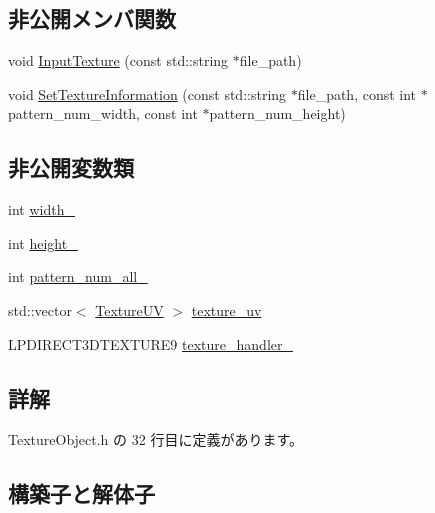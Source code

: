 \subsection*{非公開メンバ関数}
\begin{DoxyCompactItemize}
\item 
void \mbox{\hyperlink{class_texture_object_a93196fc80c026672b8a15cec21ef5dea}{Input\+Texture}} (const std\+::string $\ast$file\+\_\+path)
\item 
void \mbox{\hyperlink{class_texture_object_a76d33ff56004c8f8f00b004849990940}{Set\+Texture\+Information}} (const std\+::string $\ast$file\+\_\+path, const int $\ast$pattern\+\_\+num\+\_\+width, const int $\ast$pattern\+\_\+num\+\_\+height)
\end{DoxyCompactItemize}
\subsection*{非公開変数類}
\begin{DoxyCompactItemize}
\item 
int \mbox{\hyperlink{class_texture_object_a8e3d1b2b233672e0ea161b21d9c1cae0}{width\+\_\+}}
\item 
int \mbox{\hyperlink{class_texture_object_a093e31e35a181fe208cc8a0c0cdb5e2f}{height\+\_\+}}
\item 
int \mbox{\hyperlink{class_texture_object_ad1a6d93638b7b6f2c69612e04a03d879}{pattern\+\_\+num\+\_\+all\+\_\+}}
\item 
std\+::vector$<$ \mbox{\hyperlink{struct_texture_object_1_1_texture_u_v}{Texture\+UV}} $>$ \mbox{\hyperlink{class_texture_object_a494307c92847607e702d51f31c24dba6}{texture\+\_\+uv}}
\item 
L\+P\+D\+I\+R\+E\+C\+T3\+D\+T\+E\+X\+T\+U\+R\+E9 \mbox{\hyperlink{class_texture_object_a7274bd60ef37cd410b49e8cfc579624e}{texture\+\_\+handler\+\_\+}}
\end{DoxyCompactItemize}


\subsection{詳解}


 Texture\+Object.\+h の 32 行目に定義があります。



\subsection{構築子と解体子}
\mbox{\label{class_texture_object_add74bde2c60ec3d61229ce70b26602f2}} 
